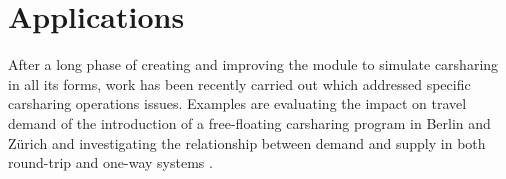\section{Applications}
After a long phase of creating and improving the module to simulate carsharing in all its forms, work has been recently carried out which addressed specific carsharing operations issues. Examples are evaluating the impact on travel demand of the introduction of a free-floating carsharing program in Berlin \citep[][]{CiariEtAl_TRR_2014} and Zürich \citep[][]{CiariEtAl_Transportation_2014} and investigating the relationship between demand and supply in both round-trip and one-way systems \citep[][]{BalacEtAl_TRB_2015}.




